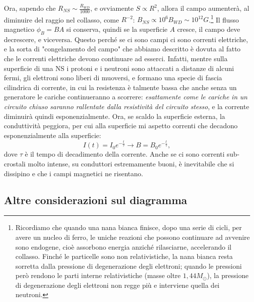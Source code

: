 Ora, sapendo che $R_{NS}\sim \frac{R_{WD}}{1000} $, e ovviamente $S\propto R^2 $, allora il campo aumenterà, al diminuire del raggio nel collasso, come $R^{-2}$: $B_{NS}\propto 10^6B_{WD} \sim 10^{12}G$.\footnote{Ricordiamo che quando una nana bianca finisce, dopo una serie di cicli, per avere un nucleo di ferro, le uniche reazioni che possono continuare ad avvenire sono endogene, cioè assorbono energia anziché rilasciarne, accelerando il collasso.
Finché le particelle sono non relativistiche, la nana bianca resta sorretta dalla pressione di degenerazione degli elettroni; quando le pressioni però rendono le parti interne relativistiche (masse oltre $1,44M_{\odot}$), la pressione di degenerazione degli elettroni non regge più e interviene quella dei neutroni.}
Il flusso magnetico $\phi_B=BA $ si conserva, quindi se la superficie $A$ cresce, il campo deve decrescere, e viceversa.
Questo perché se ci sono campi ci sono correnti elettriche, e la sorta di "congelamento del campo" che abbiamo descritto è dovuta al fatto che le correnti elettriche devono continuare ad esserci. 
Infatti, mentre sulla superficie di una NS i protoni e i neutroni sono attaccati a distanze di alcuni fermi, gli elettroni sono liberi di muoversi, e formano una specie di fascia cilindrica di corrente, in cui la resistenza è talmente bassa che anche senza un generatore le cariche continueranno a scorrere: \textit{esattamente come le cariche in un circuito chiuso saranno rallentate dalla resistività del circuito stesso}, e la corrente diminuirà quindi esponenzialmente.
Ora, se scaldo la superficie esterna, la conduttività peggiora, per cui alla superficie mi aspetto correnti che decadono esponenzialmente alla superficie:
\begin{equation}
    I(t)=I_0e^{-\frac{t}{\tau}} \xrightarrow{} B=B_0e^{-\frac{t}{\tau}},
    \label{eq: decadimento esponenziale}
\end{equation}
dove $\tau$ è il tempo di decadimento della corrente.
Anche se ci sono correnti sub-crostali molto intense, su conduttori estremamente buoni, è inevitabile che si dissipino e che i campi magnetici ne risentano.

\subsection{Altre considerazioni sul diagramma}
